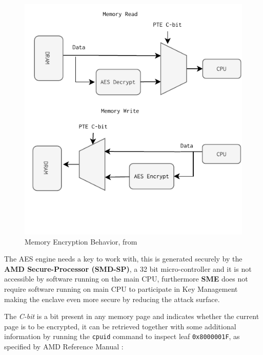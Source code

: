 \documentclass[twocolumn]{article}
\begin{document}
\begin{figure}
    \label{fig:memory-encryption}
    \centering
    \includegraphics[scale=0.9]{img/read-write.pdf}
    \caption{Memory Encryption Behavior, from \cite{memory-encryption}}
\end{figure}

The AES engine needs a key to work with, this is generated securely by the \textbf{AMD Secure-Processor (SMD-SP)}, a 32 bit micro-controller and it is not accessible by software running on the main CPU, furthermore \textbf{SME} does not require software running on main CPU to participate in Key Management making the enclave even more secure by reducing the attack surface.

The \textit{C-bit} is a bit present in any memory page and indicates whether the current page is to be encrypted, it can be retrieved together with some additional information by running the \texttt{cpuid} command to inspect leaf \texttt{0x8000001F}, as specified by AMD Reference Manual \cite{architecture-reference}:
\end{document}
